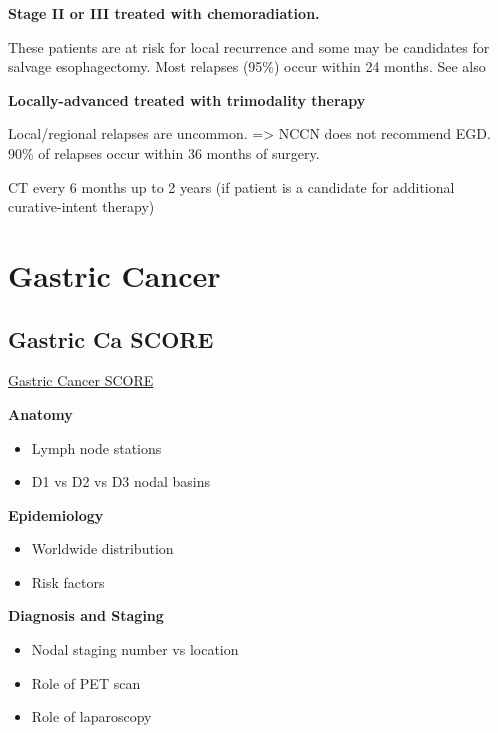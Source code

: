 \documentclass[
]{book}
\providecommand{\tightlist}{%
  \setlength{\itemsep}{0pt}\setlength{\parskip}{0pt}}
\begin{document}
\textbf{Stage II or III treated with chemoradiation.}

These patients are at risk for local recurrence \citep{sudo3400} and some may be candidates for salvage esophagectomy. Most relapses (95\%) occur within 24 months. See also \citep{taketa1139}

\textbf{Locally-advanced treated with trimodality therapy}

Local/regional relapses are uncommon. \citep{dorth2099} \citep{oppedijk385} \citep{sudo4306} =\textgreater{} NCCN does not recommend EGD. 90\% of relapses occur within 36 months of surgery.

CT every 6 months up to 2 years (if patient is a candidate for additional curative-intent therapy)

\hypertarget{part-gastric-cancer}{%
\part*{Gastric Cancer}\label{part-gastric-cancer}}

\hypertarget{gastric-ca-score}{%
\chapter{Gastric Ca SCORE}\label{gastric-ca-score}}

\href{http://portal.surgicalcore.org/modulecontent.aspx?id=128003}{Gastric Cancer SCORE}

\textbf{Anatomy}

\begin{itemize}
\tightlist
\item
  Lymph node stations
\item
  D1 vs D2 vs D3 nodal basins
\end{itemize}

\textbf{Epidemiology}

\begin{itemize}
\tightlist
\item
  Worldwide distribution
\item
  Risk factors
\end{itemize}

\textbf{Diagnosis and Staging}

\begin{itemize}
\tightlist
\item
  Nodal staging number vs location
\item
  Role of PET scan
\item
  Role of laparoscopy
\end{itemize}
\end{document}
